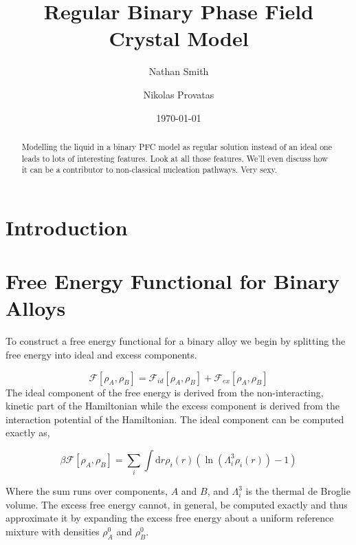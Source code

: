 \documentclass[showkeys, reprint]{revtex4-1}
\newcommand{\F}{\mathcal{F}}
\newcommand{\A}{\rho_A}
\newcommand{\B}{\rho_B}
\renewcommand{\d}{\mathrm{d}}
\renewcommand{\l}{\left}
\renewcommand{\r}{\right}
\begin{document}

\title{Regular Binary Phase Field Crystal Model}
\author{Nathan Smith}
\author{Nikolas Provatas}
\date{\today}

\begin{abstract}

Modelling the liquid in a binary PFC model as regular solution instead of an ideal one leads to lots of interesting features. Look at all those features. We'll even discuss how it can be a contributor to non-classical nucleation pathways. Very sexy.

\end{abstract}


\maketitle


\section{Introduction}

\section{Free Energy Functional for Binary Alloys}

To construct a free energy functional for a binary alloy we begin by splitting the free energy into ideal and excess components.

\begin{equation}
	\mathcal{F}[\A, \B] = \F_{id}[\A, \B] + \F_{ex}[\A, \B]
\end{equation}
The ideal component of the free energy is derived from the non-interacting, kinetic part of the Hamiltonian while the excess component is derived from the interaction potential of the Hamiltonian. The ideal component can be computed exactly as, 

\begin{equation}
	\beta\F[\A, \B] = \sum_{i}\int \d r \rho_i(r) \l(\ln\l(\Lambda_i^3\rho_i(r)\r) -1 \r)
\end{equation}

Where the sum runs over components, $A$ and $B$, and $\Lambda_i^3$ is the thermal de Broglie volume. The excess free energy cannot, in general, be computed exactly and thus approximate it by expanding the excess free energy about a uniform reference mixture with densities $\A^0$ and $\B^0$.
\end{document}
